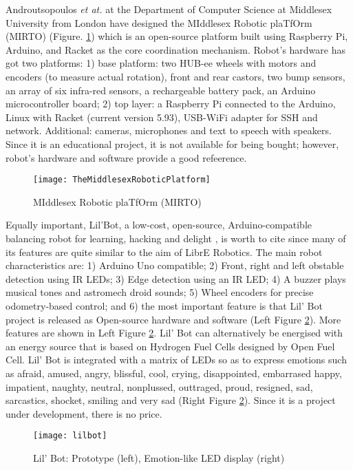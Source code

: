  
Androutsopoulos \emph{et at.}  \cite{Androutsopoulos2014} at the Department of Computer 
Science at Middlesex University from London have designed the MIddlesex Robotic plaTfOrm 
(MIRTO) (Figure. \ref{fig:RacketRobot}) which is an open-source platform built using 
Raspberry Pi, Arduino, and Racket as the core coordination mechanism. Robot's 
hardware has got two platforms: 1) base platform: two HUB-ee wheels with motors and 
encoders (to measure actual rotation), front and rear castors, two bump sensors, an array 
of six infra-red sensors, a rechargeable battery pack, an Arduino microcontroller board;
2) top layer: a Raspberry Pi connected to the Arduino, Linux with Racket (current version 
5.93), USB-WiFi adapter for SSH and network. Additional: cameras, microphones and text to 
speech with speakers. Since it is an educational project, it is not available for being 
bought; however, robot's hardware and software provide a good refeerence.
 \begin{figure}[htbp!] 
\centering    
\texttt{[image: TheMiddlesexRoboticPlatform]}
\caption[PA]{MIddlesex Robotic plaTfOrm (MIRTO)}
\label{fig:RacketRobot}
\end{figure}
 
Equally important, Lil'Bot, a low-cost, open-source, Arduino-compatible balancing robot 
for learning, hacking and delight \cite{lilbot}, is worth to cite since many of its 
features are quite similar to the aim of LibrE Robotics. The main robot characteristics 
are: 1) Arduino Uno compatible; 2) Front, right and left obstable detection using IR 
LEDs; 3) Edge detection using an IR LED; 4) A buzzer plays musical tones and astromech 
droid sounds; 5) Wheel encoders for precise odometry-based control; and 6) the most 
important feature is that Lil' Bot project is released as Open-source hardware and 
software (Left Figure \ref{fig:lilbot}).  More features are shown in Left Figure 
\ref{fig:lilbot}. Lil' Bot can alternatively be energised with an energy source that
is based on Hydrogen Fuel Cells designed by Open Fuel Cell. Lil' Bot is integrated with 
a matrix of LEDs so as to express emotions such as afraid, amused, angry, blissful, 
cool, crying, disappointed, embarrased happy, impatient, naughty, neutral, nonplussed,
outtraged, proud, resigned, sad, sarcastics, shocket, smiling and very sad 
(Right Figure \ref{fig:lilbot}). Since it is a project under development, there is no 
price.
\begin{figure}[htbp!] 
\centering    
\texttt{[image: lilbot]}
\caption[PA]{Lil' Bot: Prototype (left), Emotion-like LED display (right)}
\label{fig:lilbot}
\end{figure}


